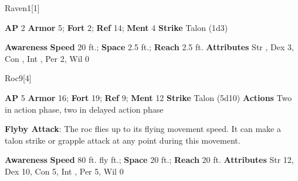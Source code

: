 \begin{monsection}{Raven}{1}[1]
\vspace{-1em}\vspace{-1em}
\begin{spellcontent}
\begin{spelltargetinginfo}
{\textbf{AP} 2}
\pari \textbf{Armor} 5;
\textbf{Fort} 2;
\textbf{Ref} 14;
\textbf{Ment} 4
\pari \textbf{Strike} Talon  (1d3)
\end{spelltargetinginfo}
\end{spellcontent}
\begin{spellsubcontent}
\begin{spellfooter}
\pari \textbf{Awareness} 
\pari \textbf{Speed} 20 ft.;
\textbf{Space} 2.5 ft.;
\textbf{Reach} 2.5 ft.
\pari \textbf{Attributes}
Str ,
Dex 3,
Con ,
Int ,
Per 2,
Wil 0
\end{spellfooter}
\end{spellsubcontent}
\end{monsection}
\begin{monsection}{Roc}{9}[4]
\vspace{-1em}\vspace{-1em}
\begin{spellcontent}
\begin{spelltargetinginfo}
{\textbf{AP} 5}
\pari \textbf{Armor} 16;
\textbf{Fort} 19;
\textbf{Ref} 9;
\textbf{Ment} 12
\pari \textbf{Strike} Talon  (5d10)
\pari \textbf{Actions} Two in action phase, two in delayed action phase
\end{spelltargetinginfo}
\begin{spelleffects}
\pari
\textbf{Flyby Attack}:
The roc flies up to its flying movement speed.
It can make a talon strike or grapple attack at any point during this movement.
\end{spelleffects}
\end{spellcontent}
\begin{spellsubcontent}
\begin{spellfooter}
\pari \textbf{Awareness} 
\pari \textbf{Speed} 80 ft. fly ft.;
\textbf{Space} 20 ft.;
\textbf{Reach} 20 ft.
\pari \textbf{Attributes}
Str 12,
Dex 10,
Con 5,
Int ,
Per 5,
Wil 0
\end{spellfooter}
\end{spellsubcontent}
\end{monsection}
